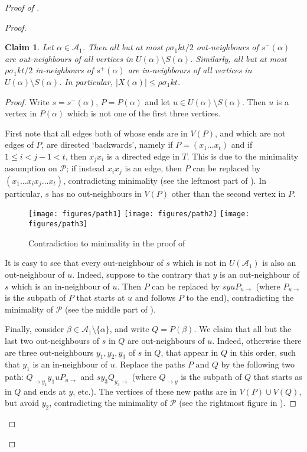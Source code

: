 \documentclass[english]{article}
\theoremstyle{plain}
\newtheorem{claim}[theorem]{Claim}
\theoremstyle{remark}
\def\PP{\mathcal{P}}
\def \sp {s^+}
\def \smm {s^-}
\newcommand{\A}{\mathcal{A}}
\begin{document}
\begin{proof}[Proof of ]
\begin{proof}
			\begin{claim} \label{claim:nbds-paths}
				Let $\alpha \in \A_1$. Then all but at most $\rho\sigma_1 kt/2$ out-neighbours of $\smm(\alpha)$ are out-neighbours of all vertices in $U(\alpha) \setminus S(\alpha)$. Similarly, all but at most $\rho \sigma_1 kt/2$ in-neighbours of $\sp(\alpha)$ are in-neighbours of all vertices in $U(\alpha) \setminus S(\alpha)$.   
				In particular, $|X(\alpha)| \le \rho \sigma_1 kt$.
			\end{claim}
			
			\begin{proof}
				Write $s = \smm(\alpha)$, $P = P(\alpha)$ and let $u \in U(\alpha) \setminus S(\alpha)$. Then $u$ is a vertex in $P(\alpha)$ which is not one of the first three vertices.

				First note that all edges both of whose ends are in $V(P)$, and which are not edges of $P$, are directed `backwards', namely if $P = (x_1 \ldots x_t)$ and if $1 \le i < j - 1 < t$, then $x_j x_i$ is a directed edge in $T$. This is due to the minimality assumption on $\PP$; if instead $x_i x_j$ is an edge, then $P$ can be replaced by $(x_1 \ldots x_i x_j \ldots x_t)$, contradicting minimality (see the leftmost part of ). In particular, $s$ has no out-neighbours in $V(P)$ other than the second vertex in $P$. 

				\begin{figure}[ht]
					\centering
					\texttt{[image: figures/path1]}
					\hspace{2.2cm}
					\texttt{[image: figures/path2]}
					\hspace{2.2cm}
					\texttt{[image: figures/path3]}
					\caption{Contradiction to minimality in the proof of }
					\label{fig:P}
				\end{figure}

				It is easy to see that every out-neighbour of $s$ which is not in $U(\A_1)$ is also an out-neighbour of $u$. Indeed, suppose to the contrary that $y$ is an out-neighbour of $s$ which is an in-neighbour of $u$. Then $P$ can be replaced by $syu P_{u \to}$ (where $P_{u \to}$ is the subpath of $P$ that starts at $u$ and follows $P$ to the end), contradicting the minimality of $\PP$ (see the middle part of ).

				Finally, consider $\beta \in \A_1 \setminus \{\alpha\}$, and write $Q = P(\beta)$. We claim that all but the last two out-neighbours of $s$ in $Q$ are out-neighbours of $u$. Indeed, otherwise there are three out-neighbours $y_1, y_2, y_3$ of $s$ in $Q$, that appear in $Q$ in this order, such that $y_1$ is an in-neighbour of $u$. 
				Replace the paths $P$ and $Q$ by the following two path: $Q_{\to y_1} y_1 u P_{u \to}$ and $s y_3 Q_{y_3 \to}$ (where $Q_{\to y}$ is the subpath of $Q$ that starts as in $Q$ and ends at $y$, etc.).
				The vertices of these new paths are in $V(P) \cup V(Q)$, but avoid $y_2$, contradicting the minimality of $\PP$ (see the rightmost figure in ).


\end{proof}
\end{proof}
\end{proof}
\end{document}
